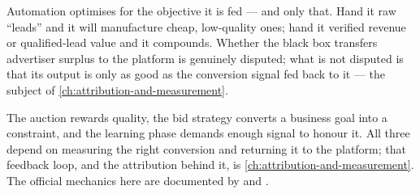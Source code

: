 \begin{contested}
Automation optimises for the objective it is fed --- and only that. Hand it raw ``leads'' and it will manufacture cheap, low-quality ones; hand it verified revenue or qualified-lead value and it compounds. Whether the black box transfers advertiser surplus to the platform is genuinely disputed; what is not disputed is that its output is only as good as the conversion signal fed back to it --- the subject of \cref{ch:attribution-and-measurement}.
\end{contested}

The auction rewards quality, the bid strategy converts a business goal into a constraint, and the learning phase demands enough signal to honour it. All three depend on measuring the right conversion and returning it to the platform; that feedback loop, and the attribution behind it, is \cref{ch:attribution-and-measurement}. The official mechanics here are documented by \textcite{gads1722122} and \textcite{metadev-advantage-campaigns}.
